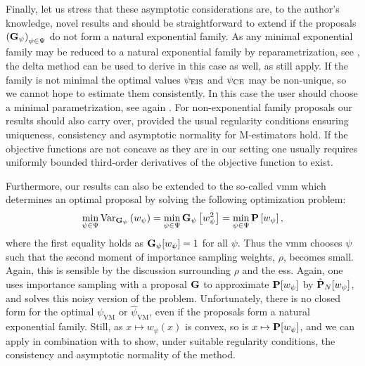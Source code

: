 Finally, let us stress that these asymptotic considerations are, to the author's knowledge, novel results and should be straightforward to extend if the proposals $\left(\G_{\psi}\right)_{\psi \in \Psi}$ do not form a natural exponential family. As any minimal exponential family may be reduced to a natural exponential family by reparametrization, see \citep[Theorem 1.9]{Brown1986Fundamentals}, the delta method can be used to derive  in this case as well, as  still apply. If the family is not minimal the optimal values $\peis$ and $\pce$ may be non-unique, so we cannot hope to estimate them consistently. In this case the user should choose a minimal parametrization, see again \citep[Theorem 1.9]{Brown1986Fundamentals}. 
For non-exponential family proposals our results should also carry over, provided the usual regularity conditions ensuring uniqueness, consistency and asymptotic normality for M-estimators hold. If the objective functions are not concave as they are in our setting one usually requires uniformly bounded third-order derivatives of the objective function to exist. 

Furthermore, our results can also be extended to the so-called \gls{vmm} which determines an optimal proposal by solving the following optimization problem:
$$
\min_{\psi\in\Psi} \var_{\G_{\psi}} \left( w_{\psi}  \right) = \min_{\psi \in \Psi} \G_{\psi} \left[w_{\psi}^2\right] = \min_{\psi\in\Psi} \P \left[w_{\psi} \right],
$$
where the first equality holds as $\G_{\psi}[w_{\psi}] = 1$ for all $\psi$. Thus the \acrshort{vmm} chooses $\psi$ such that the second moment of importance sampling weights, $\rho$, becomes small. Again, this is sensible by the discussion surrounding $\rho$ and the \acrshort{ess}. Again, one uses importance sampling with a proposal $\G$ to approximate $\P [w_{\psi}]$ by $\hat\P_{N} [w_{\psi}]$, and solves this noisy version of the problem.
Unfortunately, there is no closed form for the optimal $\psi_{\text{VM}}$ or $\hat\psi_{\text{VM}}$, even if the proposals form a natural exponential family. Still, as $x \mapsto w_{\psi}(x)$ is convex, so is $x \mapsto \P [w_{\psi}]$, and we can apply  in combination with  to show, under suitable regularity conditions, the consistency and asymptotic normality of the method. 
